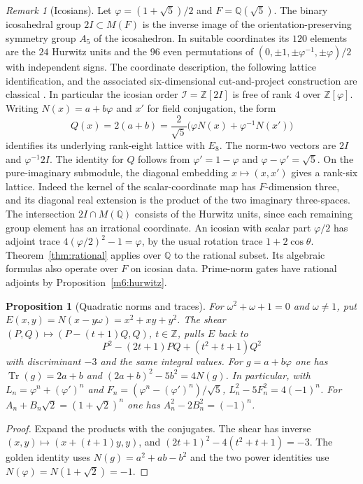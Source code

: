 \documentclass[11pt,reqno]{amsart}
\newtheorem{proposition}[theorem]{Proposition}
\theoremstyle{definition}
\theoremstyle{remark}
\newtheorem{remark}[theorem]{Remark}
\numberwithin{equation}{section}
\newcommand{\Q}{\mathbb{Q}}
\newcommand{\Z}{\mathbb{Z}}
\begin{document}
\begin{remark}[Icosians]\label{m6:icosians}
Let \(\varphi=(1+\sqrt5)/2\) and \(F=\Q(\sqrt5)\). The binary
icosahedral group \(2I\subset M(F)\) is the inverse image of the
orientation-preserving symmetry group \(A_5\) of the icosahedron.
In suitable coordinates its \(120\) elements are the \(24\) Hurwitz
units and the \(96\) even permutations of
\((0,\pm1,\pm\varphi^{-1},\pm\varphi)/2\) with independent signs.
The coordinate description, the following lattice identification,
and the associated six-dimensional cut-and-project construction
are classical \cite[Ch.~8, \S8.2]{m6:CS}
\cite{m6:MoodyPatera}. In particular the icosian order
\(\mathcal I=\Z[2I]\) is free of rank \(4\) over \(\Z[\varphi]\).
Writing \(N(x)=a+b\varphi\) and \(x'\) for field conjugation, the
form
\[
 Q(x)=2(a+b)=\frac{2}{\sqrt5}\bigl(\varphi N(x)+
                         \varphi^{-1}N(x')\bigr)
\]
identifies its underlying rank-eight lattice with \(E_8\). The
norm-two vectors are \(2I\) and \(\varphi^{-1}2I\).
The identity for \(Q\) follows from \(\varphi'=1-\varphi\) and
\(\varphi-\varphi'=\sqrt5\). On the pure-imaginary submodule, the
diagonal embedding \(x\mapsto(x,x')\) gives a rank-six lattice.
Indeed the kernel of the scalar-coordinate map has \(F\)-dimension
three, and its diagonal real extension is the product of the two
imaginary three-spaces. The intersection \(2I\cap M(\Q)\) consists
of the Hurwitz units, since each remaining group element has an
irrational coordinate. An icosian with scalar part \(\varphi/2\)
has adjoint trace \(4(\varphi/2)^2-1=\varphi\), by the usual
rotation trace \(1+2\cos\theta\). Theorem~\ref{thm:rational}
applies over \(\Q\) to the rational subset. Its algebraic formulas
also operate over \(F\) on icosian data. Prime-norm gates have
rational adjoints by Proposition~\ref{m6:hurwitz}.
\end{remark}

\begin{proposition}[Quadratic norms and traces]\label{m6:norm-forms}
For \(\omega^2+\omega+1=0\) and \(\omega\ne1\), put
\(E(x,y)=N(x-y\omega)=x^2+xy+y^2\). The shear
\((P,Q)\mapsto(P-(t+1)Q,Q)\), \(t\in\Z\), pulls \(E\) back to
\[
 P^2-(2t+1)PQ+(t^2+t+1)Q^2
\]
with discriminant \(-3\) and the same integral values.
For \(g=a+b\varphi\) one has \(\operatorname{Tr}(g)=2a+b\) and
\((2a+b)^2-5b^2=4N(g)\). In particular, with
\(L_n=\varphi^n+(\varphi')^n\) and \(F_n=(\varphi^n-(\varphi')^n)/\sqrt5\),
\(L_n^2-5F_n^2=4(-1)^n\). For \(A_n+B_n\sqrt2=(1+\sqrt2)^n\)
one has \(A_n^2-2B_n^2=(-1)^n\).
\end{proposition}
\begin{proof}
Expand the products with the conjugates. The shear has inverse
\((x,y)\mapsto(x+(t+1)y,y)\), and
\((2t+1)^2-4(t^2+t+1)=-3\). The golden identity uses
\(N(g)=a^2+ab-b^2\) and the two power identities use
\(N(\varphi)=N(1+\sqrt2)=-1\).
\end{proof}
\end{document}
